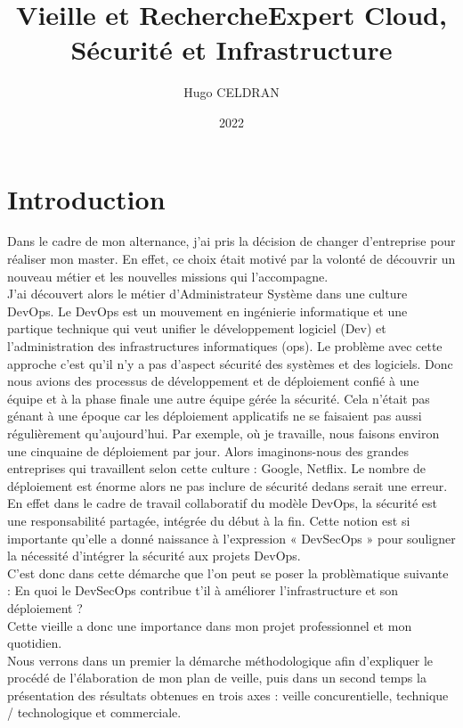 \documentclass[11pt,a4paper,oneside]{book}
\author{Hugo CELDRAN}
\title{Vieille et Recherche}
\title{Expert Cloud, Sécurité et Infrastructure}
\date{2022}
\begin{document}
\maketitle
\tableofcontents


\chapter{Introduction}

Dans le cadre de mon alternance, j'ai pris la décision de changer d'entreprise pour réaliser mon master.
En effet, ce choix était motivé par la volonté de découvrir un nouveau métier et les nouvelles missions qui l'accompagne. \\
J'ai découvert alors le métier d'Administrateur Système dans une culture DevOps.
Le DevOps est un mouvement en ingénierie informatique et une partique technique qui veut unifier le développement logiciel (Dev) et l'administration des infrastructures informatiques (ops).
Le problème avec cette approche c'est qu'il n'y a pas d'aspect sécurité des systèmes et des logiciels. Donc nous avions des processus de développement et de déploiement confié à une équipe et à la phase finale une autre équipe gérée la sécurité. Cela n'était pas génant à une époque car les déploiement applicatifs ne se faisaient pas aussi régulièrement qu'aujourd'hui. Par exemple, où je travaille, nous faisons environ une cinquaine de déploiement par jour. Alors imaginons-nous des grandes entreprises qui travaillent selon cette culture : Google, Netflix. Le nombre de déploiement est énorme alors ne pas inclure de sécurité dedans serait une erreur. \\
En effet dans le cadre de travail collaboratif du modèle DevOps, la sécurité est une responsabilité partagée, intégrée du début à la fin. Cette notion est si importante qu'elle a donné naissance à l'expression « DevSecOps » pour souligner la nécessité d'intégrer la sécurité aux projets DevOps. \\
C'est donc dans cette démarche que l'on peut se poser la problèmatique suivante : En quoi le DevSecOps contribue t'il à améliorer l'infrastructure et son déploiement ? \\
Cette vieille a donc une importance dans mon projet professionnel et mon quotidien. \\
Nous verrons dans un premier la démarche méthodologique afin d'expliquer le procédé de l'élaboration de mon plan de veille, puis dans un second temps la présentation des résultats obtenues en trois axes : veille concurentielle, technique / technologique et commerciale.
\end{document}
